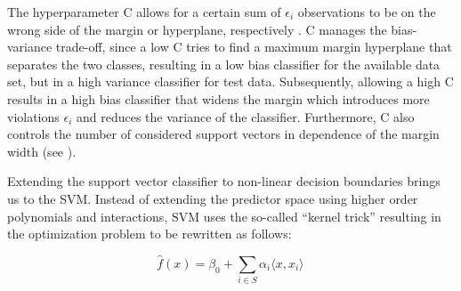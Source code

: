 The hyperparameter C allows for a certain sum of $\epsilon_i$ observations to be on the wrong side of the margin or hyperplane, respectively \cite{James:2014:ISL:2517747}. C manages the bias-variance trade-off, since a low C tries to find a maximum margin hyperplane that separates the two classes, resulting in a low bias classifier for the available data set, but in a high variance classifier for test data. Subsequently, allowing a high C results in a high bias classifier that widens the margin which introduces more violations $\epsilon_i$ and reduces the variance of the classifier. Furthermore, C also controls the number of considered support vectors in dependence of the margin width (see \cite{efron_hastie_2016}).

Extending the support vector classifier to non-linear decision boundaries brings us to the SVM. Instead of extending the predictor space using higher order polynomials and interactions, SVM uses the so-called ``kernel trick'' \cite{efron_hastie_2016} resulting in the optimization problem to be rewritten as follows:

\begin{equation}
  \hat f(x) = \beta_0 + \sum_{i \in S} \alpha_i \langle x, x_i \rangle \,
\end{equation}

